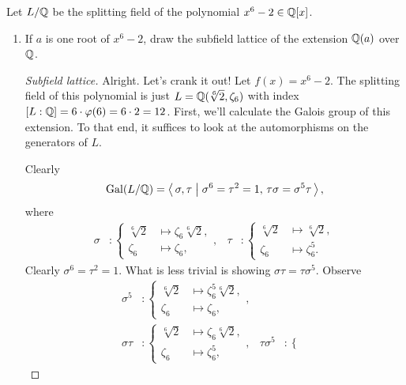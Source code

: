 \begin{problem}
  Let $L/\mathbb{Q}$ be the splitting field of the
  polynomial $x^6-2\in\mathbb{Q}[x]$.
  \begin{enumerate}[label=(\alph*)]
  \item If $a$ is one root of $x^6-2$, draw the subfield lattice
    of the extension $\mathbb{Q}(a)$ over $\mathbb{Q}$.
    \begin{proof}[Subfield lattice]
      Alright. Let's crank it out! Let $f(x)=x^6-2$. The
      splitting field of this polynomial is just
      $L=\mathbb{Q}(\sqrt[6]{2},\zeta_6)$ with index
      $[L:\mathbb{Q}]=6\cdot\varphi(6)=6\cdot 2=12$. First, we'll
      calculate the Galois group of this extension. To that end,
      it suffices to look at the automorphisms on the generators
      of $L$.

      Clearly
      \[\operatorname{Gal}(L/\mathbb{Q})=\left<\,
        \sigma,\tau\;\middle|\;
        \sigma^6=\tau^2=1,\,\tau\sigma=\sigma^5\tau\, \right>,\]
      where
      \begin{align*}
        \sigma
        &\colon
          \begin{cases}
            \sqrt[6]{2}&\longmapsto\zeta_6\sqrt[6]{2},\\
            \zeta_6&\longmapsto\zeta_6,
          \end{cases},
        &\tau
        &\colon
          \begin{cases}
            \sqrt[6]{2}&\longmapsto\sqrt[6]{2},\\
            \zeta_6&\longmapsto\zeta_6^5.
          \end{cases}
      \end{align*}
      Clearly $\sigma^6=\tau^2=1$. What is less trivial is
      showing $\sigma\tau=\tau\sigma^5$. Observe
      \begin{align*}
        \sigma^5
        &\colon
          \begin{cases}
            \sqrt[6]{2}&\longmapsto\zeta_6^5\sqrt[6]{2},\\
            \zeta_6&\longmapsto\zeta_6,
          \end{cases},\\
        \sigma\tau
          &\colon
            \begin{cases}
              \sqrt[6]{2}&\longmapsto\zeta_6\sqrt[6]{2},\\
              \zeta_6&\longmapsto\zeta_6^5,
            \end{cases},
        &\tau\sigma^5
        &\colon
          \begin{cases}

\end{cases}
\end{align*}
\end{proof}
\end{enumerate}
\end{problem}

